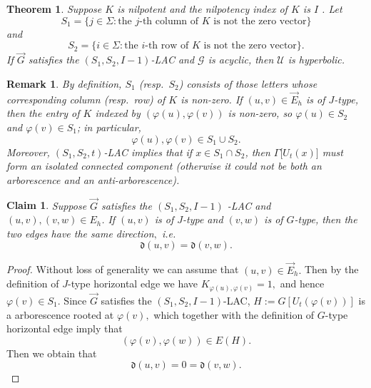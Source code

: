 \documentclass[reqno]{amsart}
\newtheorem{theorem}{Theorem}
\theoremstyle{plain}
\newtheorem{claim}{Claim}
\newtheorem{remark}{Remark}
\numberwithin{equation}{section}
\begin{document}
\begin{theorem}
\label{th-lac}Suppose $K$ is nilpotent and the nilpotency index of $K$ is $I$%
. Let 
\begin{equation*}
S_{1}=\{j\in \Sigma :\text{the }j\text{-th column of }K\text{ is not the
zero vector}\}
\end{equation*}%
and 
\begin{equation*}
S_{2}=\{i\in \Sigma :\text{the }i\text{-th row of }K\text{ is not the zero
vector}\}.
\end{equation*}%
If $\overrightarrow{G}$ satisfies the $(S_{1},S_{2},I-1)$-LAC and $\mathcal{G%
}$ is acyclic, then $\mathcal{U}$ is hyperbolic.
\end{theorem}

\begin{remark}
\label{rmk3}By definition, $S_{1}$ (resp.\ $S_{2}$) consists of those
letters whose corresponding column (resp.\ row) of $K$ is non-zero. If $%
(u,v)\in \overrightarrow{E}_{h}$ is of $J$-type, then the entry of $K$
indexed by $(\varphi (u),\varphi (v))$ is non-zero, so $\varphi (u)\in S_{2}$
and $\varphi (v)\in S_{1}$; in particular, 
\begin{equation}
\varphi (u),\varphi (v)\in S_{1}\cup S_{2}.  \label{S1S2}
\end{equation}%
Moreover, $(S_{1},S_{2},t)$-LAC implies that if $x\in S_{1}\cap S_{2}$, then 
$\Gamma \lbrack U_{t}(x)]$ must form an isolated connected component
(otherwise it could not be both an arborescence and an anti-arborescence).
\end{remark}

\begin{claim}
\label{clm0}Suppose $\overrightarrow{G}$ satisfies the $(S_{1},S_{2},I-1)$%
-LAC and $(u,v),(v,w)\in E_{h}$. If $(u,v)$ is of $J$-type and $(v,w)$ is of 
$G$-type, then the two edges have the same direction$,$ i.e. 
\begin{equation*}
\mathfrak{d}(u,v)=\mathfrak{d}(v,w).
\end{equation*}
\end{claim}

\begin{proof}
Without loss of generality we can assume that $(u,v)\in \overrightarrow{E}%
_{h}.$ Then by the definition of $J$-type horizontal edge we have $%
K_{\varphi (u),\varphi (v)}=1,$ and hence $\varphi (v)\in S_{1}.$ Since $%
\overrightarrow{G}$ satisfies the $(S_{1},S_{2},I-1)$-LAC, $%
H:=G[U_{t}(\varphi (v))]$ is a arborescence rooted at $\varphi (v),$ which
together with the definition of $G$-type horizontal edge imply that 
\begin{equation*}
(\varphi (v),\varphi (w))\in E(H).
\end{equation*}%
Then we obtain that 
\begin{equation*}
\mathfrak{d}(u,v)=0=\mathfrak{d}(v,w).
\end{equation*}
\end{proof}
\end{document}

